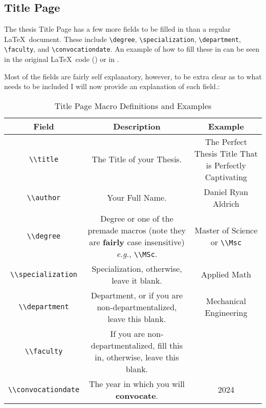 		\subsection{Title Page}
			The thesis Title Page has a few more fields to be filled in than a regular \LaTeX\ document.
			These include \lstinline|\degree|, \lstinline|\specialization|, \lstinline|\department|, \lstinline|\faculty|, and \lstinline|\convocationdate|.
			An example of how to fill these in can be seen in the original \LaTeX\ code () or in .

			Most of the fields are fairly self explanatory, however, to be extra clear as to what needs to be included I will now provide an explanation of each field.:

			\begin{table}[H]
			\caption{Title Page Macro Definitions and Examples}
			\label{tab:titlePage}
			\begin{tabularx}{0.9\textwidth}{cCC}
				\toprule
					\textbf{Field} & \textbf{Description} & \textbf{Example}\\
				\midrule
					\lstinline|\\title|  & The Title of your Thesis. & The Perfect Thesis Title That is Perfectly Captivating\\
					\lstinline|\\author| & Your Full Name. & Daniel Ryan Aldrich\\
					\lstinline|\\degree| & Degree or one of the premade macros (note they are \textbf{fairly} case insensitive) \textit{e.g.}, \lstinline|\\MSc|. & Master of Science or \lstinline|\\Msc|\\
					\lstinline|\\specialization| & Specialization, otherwise, leave it blank. & Applied Math\\
					\lstinline|\\department| & Department, or if you are non-departmentalized, leave this blank. & Mechanical Engineering\\
					\lstinline|\\faculty| & If you are non-departmentalized, fill this in, otherwise, leave this blank. & \\
					\lstinline|\\convocationdate| & The year in which you will \textbf{convocate}. & 2024\\
				\bottomrule
			\end{tabularx}
			\end{table}

